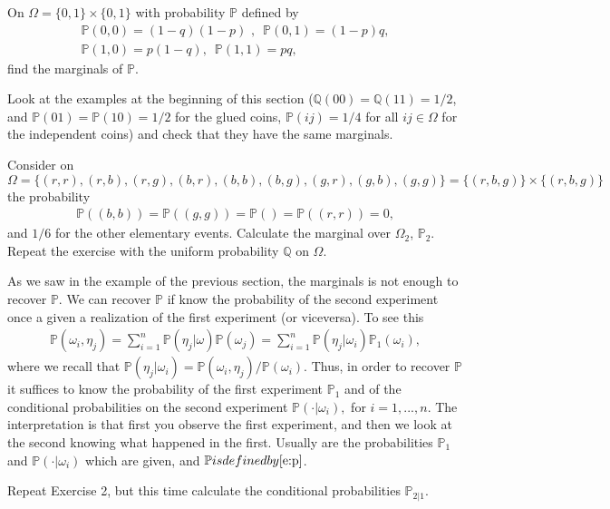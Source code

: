 \documentclass[12pt]{article}
\newcommand{\<}{{\langle \!\! \langle}}
\renewcommand{\>}{{\rangle \!\! \rangle}}
\newcommand{\bel}[2]{\begin{equation} \label{#1} \begin{split} #2
 					\end{split} \end{equation}}
\begin{document}
\begin{ExerciseList}

\Exercise
On $\Omega=\{0,1\}\times\{0,1\}$ with probability $\mathbb{P}$ defined by
\bel{}{\mathbb{P}(0,0)=(1-q)(1-p)\,\,,\,\,\,\mathbb{P}(0,1)=(1-p)q,\\ \mathbb{P}(1,0)=p(1-q),\,\,\,\mathbb{P}(1,1)=pq,}
find the marginals of $\mathbb{P}$.

\Exercise Look at the examples at the beginning of this section 
($\mathbb{Q}(00)=\mathbb{Q}(11)=1/2$, and $\mathbb{P}(01)=\mathbb{P}(10)=1/2$ for the glued coins, $\mathbb{P}(ij)= 1/4$ for all $ij\in\Omega$ for the independent coins) 
and check that they have the same marginals.

\Exercise
Consider on $\Omega=\{(r,r),(r,b),(r,g), (b,r),(b,b),(b,g),(g,r),(g,b),(g,g)\}=\{(r,b,g)\}\times\{(r,b,g)\}$ the probability 
\bel{}{\mathbb{P}((b,b))=\mathbb{P}((g,g))=\mathbb{P}()=\mathbb{P}((r,r))=0,} and $1/6$ for the other elementary events.  Calculate the marginal over $\Omega_2$, $\mathbb{P}_2$.
Repeat the exercise with the uniform probability $\mathbb{Q}$ on $\Omega$.

\end{ExerciseList}

As we saw in the example of the previous section, the marginals is not enough to recover $\mathbb{P}$. We can recover $\mathbb{P}$ if  know the probability of the second experiment once a given a realization of the first experiment (or viceversa).
To see this
\bel{e:p}{\mathbb{P}(\omega_i,\eta_j) = \sum_{i=1}^n \mathbb{P}(\eta_j|\omega)\mathbb{P}(\omega_j)=\sum_{i=1}^n\mathbb{P}(\eta_j|\omega_i)\mathbb{P}_1(\omega_i),}
 where we recall that $\mathbb{P}(\eta_j| \omega_i) = \mathbb{P}(\omega_i,\eta_j)/\mathbb{P}(\omega_i).$
 Thus, in order to recover $\mathbb{P}$ it suffices to know the probability of the first experiment $\mathbb{P}_1$ and of the conditional probabilities on the second experiment $\mathbb{P}(\cdot | \omega_i),$ for $i=1,...,n$. 
 The interpretation is that first you observe the first experiment, and then we look at the second knowing what happened in the first. Usually are the probabilities $\mathbb{P}_1$ and $\mathbb{P}(\cdot | \omega_i)$ which are given, and $\mathbb{P} is defined by \eqref{e:p}$.
 
\begin{ExerciseList}
\Exercise Repeat Exercise 2, but this time calculate the conditional probabilities $\mathbb{P}_{2|1}$.
\end{ExerciseList}
\end{document}
